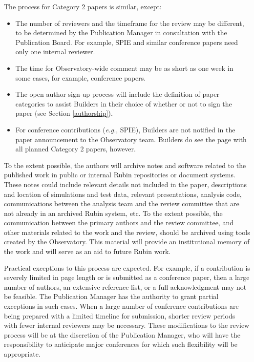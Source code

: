 The process for Category 2 papers is similar, except:

\begin{itemize}
\item
  The number of reviewers and the timeframe for the review may be different, to be determined by the Publication Manager in consultation with the Publication Board.
  For example, SPIE and similar conference papers need only one internal reviewer.
\item
  The time for Observatory-wide comment may be as short as one week in some cases, for example, conference papers.
\item
  The open author sign-up process will include the definition of paper categories to assist Builders in their choice of whether or not to sign the paper (see Section \ref{authorship}).
\item
  For conference contributions (\emph{e.g.}, SPIE), Builders are not notified in the paper announcement to the Observatory team.
  Builders do see the page with all planned Category 2 papers, however.
\end{itemize}

To the extent possible, the authors will archive notes and software related to the published work in public or internal Rubin repositories or document systems.
These notes could include relevant details not included in the paper, descriptions and location of simulations and test data, relevant presentations, analysis code, communications between the analysis team and the review committee that are not already in an archived Rubin system, etc.
To the extent possible, the communication between the primary authors and the review committee, and other materials related to the work and the review, should be archived using tools created by the Observatory.
This material will provide an institutional memory of the work and will serve as an aid to future Rubin work.

Practical exceptions to this process are expected.
For example, if a contribution is severely limited in page length or is submitted as a conference paper, then a large number of authors, an extensive reference list, or a full acknowledgment may not be feasible.
The Publication Manager has the authority to grant partial exceptions in such cases.
When a large number of conference contributions are being prepared with a limited timeline for submission, shorter review periods with fewer internal reviewers may be necessary.
These modifications to the review process will be at the discretion of the Publication Manager, who will have the responsibility to anticipate major conferences for which such flexibility will be appropriate.

